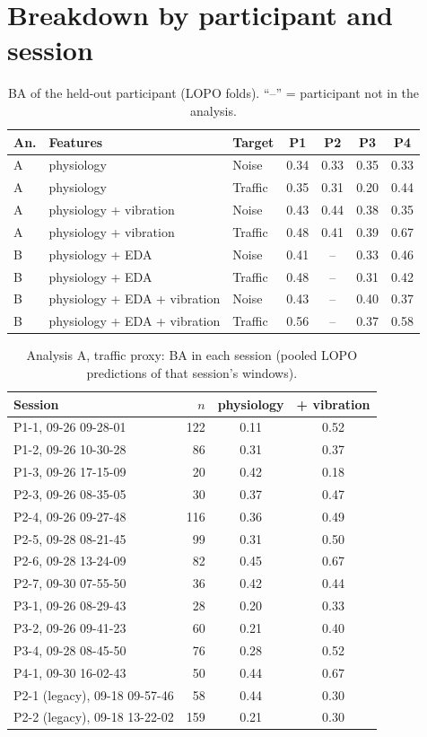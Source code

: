 \documentclass[runningheads]{llncs}
\begin{document}
\section{Breakdown by participant and session}
\begin{table}[h]
\caption{BA of the held-out participant (LOPO folds). ``--'' = participant not in the analysis.}
\footnotesize\centering
\begin{tabular}{@{}lllcccc@{}}
\toprule
An. & Features & Target & P1 & P2 & P3 & P4\\
\midrule
A & physiology & Noise & 0.34 & 0.33 & 0.35 & 0.33\\
A & physiology & Traffic & 0.35 & 0.31 & 0.20 & 0.44\\
A & physiology + vibration & Noise & 0.43 & 0.44 & 0.38 & 0.35\\
A & physiology + vibration & Traffic & 0.48 & 0.41 & 0.39 & 0.67\\
B & physiology + EDA & Noise & 0.41 & -- & 0.33 & 0.46\\
B & physiology + EDA & Traffic & 0.48 & -- & 0.31 & 0.42\\
B & physiology + EDA + vibration & Noise & 0.43 & -- & 0.40 & 0.37\\
B & physiology + EDA + vibration & Traffic & 0.56 & -- & 0.37 & 0.58\\
\bottomrule
\end{tabular}
\end{table}

\begin{table}[h]
\caption{Analysis A, traffic proxy: BA in each session (pooled LOPO predictions of that session's windows).}
\footnotesize\centering
\begin{tabular}{@{}lrcc@{}}
\toprule
Session & $n$ & physiology & + vibration\\
\midrule
P1-1, 09-26 09-28-01 & 122 & 0.11 & 0.52\\
P1-2, 09-26 10-30-28 & 86 & 0.31 & 0.37\\
P1-3, 09-26 17-15-09 & 20 & 0.42 & 0.18\\
P2-3, 09-26 08-35-05 & 30 & 0.37 & 0.47\\
P2-4, 09-26 09-27-48 & 116 & 0.36 & 0.49\\
P2-5, 09-28 08-21-45 & 99 & 0.31 & 0.50\\
P2-6, 09-28 13-24-09 & 82 & 0.45 & 0.67\\
P2-7, 09-30 07-55-50 & 36 & 0.42 & 0.44\\
P3-1, 09-26 08-29-43 & 28 & 0.20 & 0.33\\
P3-2, 09-26 09-41-23 & 60 & 0.21 & 0.40\\
P3-4, 09-28 08-45-50 & 76 & 0.28 & 0.52\\
P4-1, 09-30 16-02-43 & 50 & 0.44 & 0.67\\
P2-1 (legacy), 09-18 09-57-46 & 58 & 0.44 & 0.30\\
P2-2 (legacy), 09-18 13-22-02 & 159 & 0.21 & 0.30\\
\bottomrule
\end{tabular}
\end{table}
\end{document}
